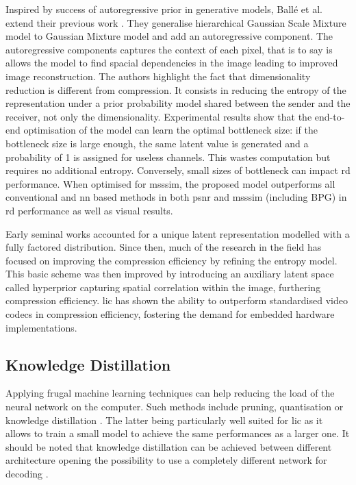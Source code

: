 \documentclass{article}
\begin{document}
Inspired by success of autoregressive prior in generative models, Ballé et al. extend their previous work \cite{minnen2018jointautoregressivehierarchicalpriors}. They generalise hierarchical Gaussian Scale Mixture model to Gaussian Mixture model and add an autoregressive component. The autoregressive components captures the context of each pixel, that is to say is allows the model to find spacial dependencies in the image leading to improved image reconstruction. The authors highlight the fact that dimensionality reduction is different from compression. It consists in reducing the entropy of the representation under a prior probability model shared between the sender and the receiver, not only the dimensionality. Experimental results show that the end-to-end optimisation of the model can learn the optimal bottleneck size: if the bottleneck size is large enough, the same latent value is generated and a probability of 1 is assigned for useless channels. This wastes computation but requires no additional entropy. Conversely, small sizes of bottleneck can impact \acrshort{rd} performance. When optimised for \acrshort{msssim}, the proposed model outperforms all conventional and \acrshort{nn} based methods in both \acrshort{psnr} and \acrshort{msssim} (including BPG) in \acrshort{rd} performance as well as visual results.

Early seminal works accounted for a unique latent representation modelled with a fully factored distribution. Since then, much of the research in the field has focused on improving the compression efficiency by refining the entropy model. This basic scheme was then improved by introducing an auxiliary latent space called hyperprior capturing spatial correlation within the image, furthering compression efficiency. \acrshort{lic} has shown the ability to outperform standardised video codecs in compression efficiency, fostering the demand for embedded hardware implementations.

\subsection{Knowledge Distillation}
Applying frugal machine learning techniques can help reducing the load of the neural network on the computer. Such methods include pruning, quantisation or knowledge distillation \cite{touvron2021trainingdataefficientimagetransformers}. The latter being particularly well suited for \acrshort{lic} as it allows to train a small model to achieve the same performances as a larger one. It should be noted that knowledge distillation can be achieved between different architecture opening the possibility to use a completely different network for decoding \cite{liu2022crossarchitectureknowledgedistillation}.
\end{document}

